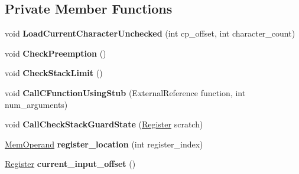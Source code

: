 \subsection*{Private Member Functions}
\begin{DoxyCompactItemize}
\item 
void {\bfseries Load\+Current\+Character\+Unchecked} (int cp\+\_\+offset, int character\+\_\+count)\hypertarget{classv8_1_1internal_1_1_reg_exp_macro_assembler_s390_aaca72bcdf985b0afc8b579c5b88e6352}{}\label{classv8_1_1internal_1_1_reg_exp_macro_assembler_s390_aaca72bcdf985b0afc8b579c5b88e6352}

\item 
void {\bfseries Check\+Preemption} ()\hypertarget{classv8_1_1internal_1_1_reg_exp_macro_assembler_s390_ad19ec6e82ef6f790e81ca0392d3cfc38}{}\label{classv8_1_1internal_1_1_reg_exp_macro_assembler_s390_ad19ec6e82ef6f790e81ca0392d3cfc38}

\item 
void {\bfseries Check\+Stack\+Limit} ()\hypertarget{classv8_1_1internal_1_1_reg_exp_macro_assembler_s390_a5638d941c9d41ef3e8bbcc8e996719dc}{}\label{classv8_1_1internal_1_1_reg_exp_macro_assembler_s390_a5638d941c9d41ef3e8bbcc8e996719dc}

\item 
void {\bfseries Call\+C\+Function\+Using\+Stub} (External\+Reference function, int num\+\_\+arguments)\hypertarget{classv8_1_1internal_1_1_reg_exp_macro_assembler_s390_a45b7cd9dd56748758b91e67bb2a36a89}{}\label{classv8_1_1internal_1_1_reg_exp_macro_assembler_s390_a45b7cd9dd56748758b91e67bb2a36a89}

\item 
void {\bfseries Call\+Check\+Stack\+Guard\+State} (\hyperlink{structv8_1_1internal_1_1_register}{Register} scratch)\hypertarget{classv8_1_1internal_1_1_reg_exp_macro_assembler_s390_a783aeef376490b726fcdaf6834d7524f}{}\label{classv8_1_1internal_1_1_reg_exp_macro_assembler_s390_a783aeef376490b726fcdaf6834d7524f}

\item 
\hyperlink{classv8_1_1internal_1_1_mem_operand}{Mem\+Operand} {\bfseries register\+\_\+location} (int register\+\_\+index)\hypertarget{classv8_1_1internal_1_1_reg_exp_macro_assembler_s390_a7804df5a023bd51508518bb92c74080d}{}\label{classv8_1_1internal_1_1_reg_exp_macro_assembler_s390_a7804df5a023bd51508518bb92c74080d}

\item 
\hyperlink{structv8_1_1internal_1_1_register}{Register} {\bfseries current\+\_\+input\+\_\+offset} ()\hypertarget{classv8_1_1internal_1_1_reg_exp_macro_assembler_s390_accd15c5e0f1ec089dbdb8dfcf2278a92}{}\label{classv8_1_1internal_1_1_reg_exp_macro_assembler_s390_accd15c5e0f1ec089dbdb8dfcf2278a92}


\end{DoxyCompactItemize}
